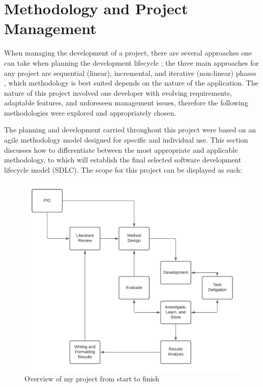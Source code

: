 \chapter{Methodology and Project Management}

When managing the development of a project, there are several approaches one can take when planning the development lifecycle \parencite{shylesh2017study}; the three main approaches for any project are sequential (linear), incremental, and iterative (non-linear) phases \parencite{akinsola2020comparative}, which methodology is best suited depends on the nature of the application. The nature of this project involved one developer with evolving requirements, adaptable features, and unforeseen management issues, therefore the following methodologies were explored and appropriately chosen.

The planning and development carried throughout this project were based on an agile methodology model designed for specific and individual use. This section discusses how to differentiate between the most appropriate and applicable methodology, to which will establish the final selected software development lifecycle model (SDLC). The scope for this project can be displayed as such:

\begin{figure}[H]
    \centering
    \includegraphics[width=\textwidth]{figures/chapter-3/ProjectOverviewFlowChart.pdf}
    \caption[Overview of Project Workflow]{Overview of my project from start to finish
    \label{fig:ProjectWorkflow}}
\end{figure}

